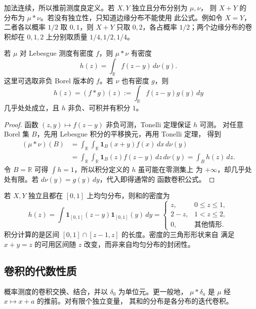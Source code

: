 加法连续，所以推前测度良定义。若 $X,Y$ 独立且分布分别为 $\mu,\nu$，
则 $X+Y$ 的分布为 $\mu*\nu$。若没有独立性，只知道边缘分布不能使用
此公式。例如令 $X=Y$，二者各以概率 $1/2$ 取 $0,1$，则 $X+Y$ 只取
$0,2$，各占概率 $1/2$；两个边缘分布的卷积却在 $0,1,2$ 上分别取质量
$1/4,1/2,1/4$。

\begin{proposition}
\label{prop:convolution-density}
若 $\mu$ 对 Lebesgue 测度有密度 $f$，则 $\mu*\nu$ 有密度
\[
 h(z)=\int_{\mathbb R}f(z-y)\,d\nu(y).
\]
这里可选取非负 Borel 版本的 $f$。若 $\nu$ 也有密度 $g$，则
\[
 h(z)=(f*g)(z):=\int_{\mathbb R}f(z-y)g(y)\,dy
\]
几乎处处成立，且 $h$ 非负、可积并有积分 $1$。
\end{proposition}

\begin{proof}
函数 $(z,y)\mapsto f(z-y)$ 非负可测，Tonelli 定理保证 $h$ 可测。
对任意 Borel 集 $B$，先用 Lebesgue 积分的平移换元，再用 Tonelli 定理，
得到
\begin{align*}
 (\mu*\nu)(B)
 &=\int_{\mathbb R}\int_{\mathbb R}\mathbf 1_B(x+y)f(x)\,dx\,d\nu(y)\\
 &=\int_{\mathbb R}\int_{\mathbb R}\mathbf 1_B(z)f(z-y)\,dz\,d\nu(y)
 =\int_Bh(z)\,dz.
\end{align*}
令 $B=\mathbb R$ 可得 $\int h=1$，所以积分定义的 $h$ 虽可能在零测集上
为 $+\infty$，却几乎处处有限。若 $d\nu(y)=g(y)\,dy$，代入即得通常的
函数卷积公式。
\end{proof}

\begin{example}[两个均匀变量的和]
若 $X,Y$ 独立且都在 $[0,1]$ 上均匀分布，则和的密度为
\[
 h(z)=\int\mathbf 1_{[0,1]}(z-y)\mathbf 1_{[0,1]}(y)\,dy
 =\begin{cases}
 z,&0\le z\le1,\\
 2-z,&1<z\le2,\\
 0,&\text{其他情形}.
 \end{cases}
\]
积分计算的是区间 $[0,1]\cap[z-1,z]$ 的长度。密度的三角形形状来自
满足 $x+y=z$ 的可用区间随 $z$ 改变，而非来自均匀分布的封闭性。
\end{example}

\subsection{卷积的代数性质}

\begin{proposition}
\label{prop:probability-convolution-algebra}
概率测度的卷积交换、结合，并以 $\delta_0$ 为单位元。更一般地，
$\mu*\delta_a$ 是 $\mu$ 经 $x\mapsto x+a$ 的推前。对有限个独立变量，
其和的分布是各分布的迭代卷积。
\end{proposition}

